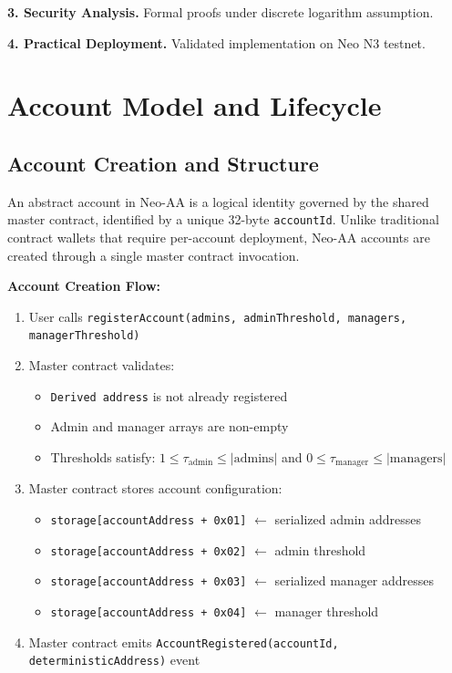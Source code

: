 \documentclass[10pt,twocolumn]{article}
\newcommand{\code}[1]{\texttt{\small #1}}
\begin{document}
{\textbf{3. Security Analysis.} Formal proofs under discrete logarithm assumption.

\textbf{4. Practical Deployment.} Validated implementation on Neo N3 testnet.



\section{Account Model and Lifecycle}

\subsection{Account Creation and Structure}

An abstract account in Neo-AA is a logical identity governed by the shared master contract, identified by a unique 32-byte \code{accountId}. Unlike traditional contract wallets that require per-account deployment, Neo-AA accounts are created through a single master contract invocation.

\textbf{Account Creation Flow:}

\begin{enumerate}[leftmargin=*,topsep=2pt,itemsep=1pt]
\item User calls \code{registerAccount(admins, adminThreshold, managers, managerThreshold)}
\item Master contract validates:
  \begin{itemize}[leftmargin=*,topsep=2pt,itemsep=1pt]
  \item \code{Derived address} is not already registered
  \item Admin and manager arrays are non-empty
  \item Thresholds satisfy: $1 \leq \tau_{\text{admin}} \leq |\text{admins}|$ and $0 \leq \tau_{\text{manager}} \leq |\text{managers}|$
  \end{itemize}
\item Master contract stores account configuration:
  \begin{itemize}[leftmargin=*,topsep=2pt,itemsep=1pt]
  \item \code{storage[accountAddress + 0x01]} $\leftarrow$ serialized admin addresses
  \item \code{storage[accountAddress + 0x02]} $\leftarrow$ admin threshold
  \item \code{storage[accountAddress + 0x03]} $\leftarrow$ serialized manager addresses
  \item \code{storage[accountAddress + 0x04]} $\leftarrow$ manager threshold
  \end{itemize}
\item Master contract emits \code{AccountRegistered(accountId, deterministicAddress)} event
\end{enumerate}

}
\end{document}
